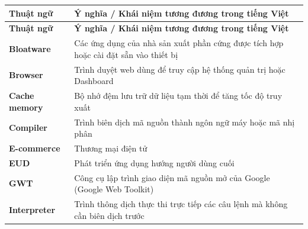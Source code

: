 \documentclass[../DoAn.tex]{subfiles}
\begin{document}
\begin{longtable}{|l|p{11.5cm}|}
\hline
\textbf{Thuật ngữ} & \textbf{Ý nghĩa / Khái niệm tương đương trong tiếng Việt} \\ \hline 
\endfirsthead

\hline
\textbf{Thuật ngữ} & \textbf{Ý nghĩa / Khái niệm tương đương trong tiếng Việt} \\ \hline 
\endhead

\hline
\endfoot

\hline
\endlastfoot

\textbf{Bloatware} & Các ứng dụng của nhà sản xuất phần cứng được tích hợp hoặc cài đặt sẵn vào thiết bị \\ \hline
\textbf{Browser} & Trình duyệt web dùng để truy cập hệ thống quản trị hoặc Dashboard \\ \hline
\textbf{Cache memory} & Bộ nhớ đệm lưu trữ dữ liệu tạm thời để tăng tốc độ truy xuất \\ \hline
\textbf{Compiler} & Trình biên dịch mã nguồn thành ngôn ngữ máy hoặc mã nhị phân \\ \hline
\textbf{E-commerce} & Thương mại điện tử \\ \hline
\textbf{EUD} & Phát triển ứng dụng hướng người dùng cuối \\ \hline
\textbf{GWT} & Công cụ lập trình giao diện mã nguồn mở của Google (Google Web Toolkit) \\ \hline
\textbf{Interpreter} & Trình thông dịch thực thi trực tiếp các câu lệnh mà không cần biên dịch trước \\ \hline
\end{longtable}
\end{document}
